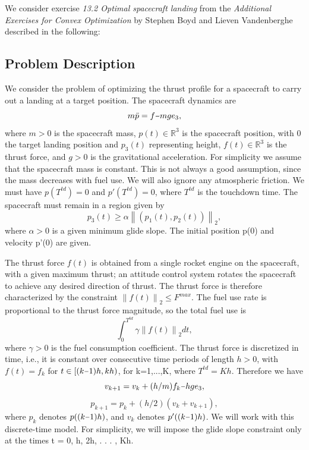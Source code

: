 \documentclass[12pt, letterpaper]{article}
\newcommand{\minus}{\scalebox{0.75}[1.0]{$-$}}
\begin{document}
We consider exercise \textit{13.2 Optimal spacecraft landing} from the \textit{Additional Exercises for Convex Optimization} by Stephen Boyd and Lieven Vandenberghe \cite{Boyd:CVXcourse_extra_exercises} described in the following:

\subsection{Problem Description}
\label{sec:problem}

We consider the problem of optimizing the thrust profile for a spacecraft to carry out a landing at a target position.
The spacecraft dynamics are
$$m\ddot{p} = f\minus mge_{3},$$ where $m > 0$ is the spacecraft mass, $p(t) \in \mathbb{R}^{3}$
is the spacecraft position, with 0 the target landing
position and $p_{3}(t)$ representing height, $f(t)\in \mathbb{R}^{3}$
is the thrust force, and $g > 0$ is the gravitational
acceleration. For simplicity we assume that the spacecraft mass is constant. This is not always
a good assumption, since the mass decreases with fuel use. We will also ignore any atmospheric
friction. We must have $p(T
^{td}) = 0$ and $p'(T^{td}) = 0$, where $T^{td}$ is the touchdown time. The
spacecraft must remain in a region given by
$$p_{3}(t) \geq \alpha \left\|(p_{1}(t), p_{2}(t))\right\|_{2},
$$ where $\alpha > 0$ is a given minimum glide slope. The initial position p(0) and velocity p'(0) are given. 

The thrust force $f(t)$ is obtained from a single rocket engine on the spacecraft, with a given
maximum thrust; an attitude control system rotates the spacecraft to achieve any desired direction
of thrust. The thrust force is therefore characterized by the constraint $\left\|f(t)\right\|_{2} \leq F^{max}$. The fuel use rate is proportional to the thrust force magnitude, so the total fuel use is
$$
\int_{0}^{T^{td}} \gamma \left\|f(t)\right\|_{2} dt,
$$
where $\gamma > 0$ is the fuel consumption coefficient. The thrust force is discretized in time, i.e., it is
constant over consecutive time periods of length $h > 0$, with $f(t) = f_{k}$ for $t \in [(k\minus 1)h, kh)$, for
k=1,...,K, where $T^{td} = Kh$. Therefore we have
$$v_{k+1} = v_{k} + (h/m)f_{k} \minus hge_{3},$$ $$p_{k+1} = p_{k} + (h/2)(v_{k} + v_{k+1}),$$
where $p_{k}$ denotes $p((k\minus 1)h)$, and $v_{k}$ denotes $p'((k\minus 1)h)$. We will work with this discrete-time model.
For simplicity, we will impose the glide slope constraint only at the times t = 0, h, 2h, . . . , Kh.
\end{document}
